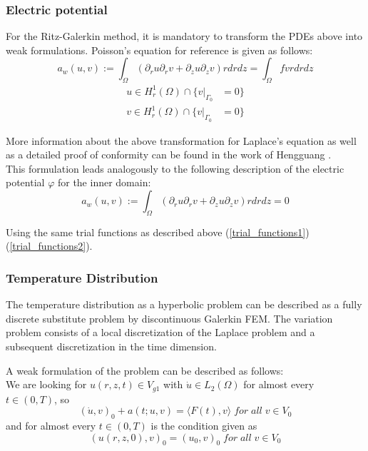 \documentclass[parskip=half, titlepage=yes, 12pt, BCOR=12mm, DIV=calc]{scrartcl}
\begin{document}
\subsubsection{Electric potential}

For the Ritz-Galerkin method, it is mandatory to transform the PDEs above into weak formulations. Poisson's equation for reference is given as follows:
\begin{equation}
    a_w(u,v) := \int_{\Omega} (\partial_r u \partial_r v + \partial_z u \partial_z v) r drdz = \int_{\Omega} f v r dr dz
\end{equation}
\begin{align}
    u \in H_r^1(\Omega) \cap \{v|_{\Gamma_{0}} &= 0 \} 
    \label{trial_functions1}\\
    v \in H_r^1(\Omega) \cap \{v|_{\Gamma_{0}} &= 0 \}     
    \label{trial_functions2}
\end{align}

More information about the above transformation for Laplace's equation as well as a detailed proof of conformity can be found in the work of Hengguang \cite{hengguang}. \\

This formulation leads analogously to the following description of the electric potential $\varphi$ for the inner domain: 
\begin{equation}
    a_w(u,v) := \int_{\Omega} (\partial_r u \partial_r v + \partial_z u \partial_z v) r drdz = 0 
\end{equation}

Using the same trial functions as described above (\ref{trial_functions1}) (\ref{trial_functions2}).  

\subsubsection{Temperature Distribution}

The temperature distribution as a hyperbolic problem can be described as a fully discrete substitute problem by discontinuous Galerkin FEM. The variation problem consists of a local discretization of the Laplace problem and a subsequent discretization in the time dimension.   

A weak formulation of the problem can be described as follows: \\
We are looking for $u(r,z,t) \in V_{g1}$ with $\Dot{u} \in L_2(\Omega)$ for almost every $t \in (0,T)$, so  
\begin{equation}
    (\Dot{u},v)_0 + a(t;u,v) = \langle F(t),v \rangle \; for \; all \; v \in V_0    
\end{equation}
and for almost every $t \in (0, T)$ is the condition given as 
\begin{equation}
    (u(r,z,0),v)_0 = (u_0,v)_0 \; for \; all \; v \in V_0
\end{equation}
\end{document}

